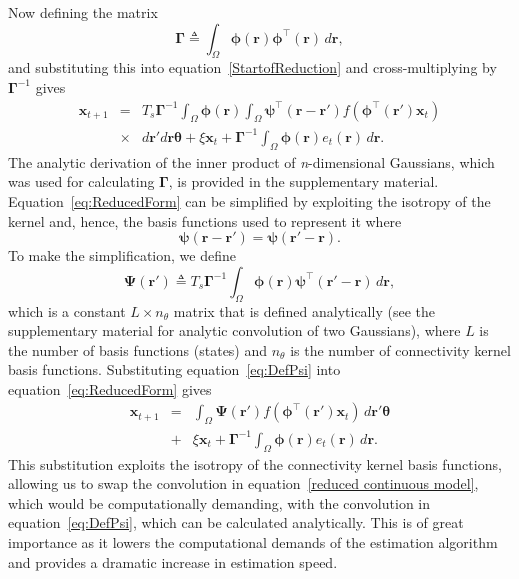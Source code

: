\documentclass[12pt]{iopart}
\begin{document}
Now defining the matrix
\begin{equation}\label{eq:DefGamma}
	\boldsymbol{\Gamma} \triangleq \int_\Omega {\boldsymbol{\phi} \left(\mathbf{r}\right)\boldsymbol{\phi} ^{\top}\left(\mathbf{r}\right) \, d\mathbf{r}}, 
\end{equation}
and substituting this into equation~\ref{StartofReduction} and cross-multiplying by $\boldsymbol{\Gamma}^{-1}$ gives
\begin{eqnarray}
    \label{eq:ReducedForm}
	 \mathbf{x}_{t+1} &=& T_s\boldsymbol{\Gamma}^{-1}
	 \int_\Omega \boldsymbol{\phi}(\mathbf{r}) 
	 \int_\Omega \boldsymbol{\psi}^{\top} (\mathbf{r}-\mathbf{r}')f(\boldsymbol{\phi}^{\top}(\mathbf{r}')\mathbf{x}_t) \nonumber \\
	&\times& d\mathbf{r}' d\mathbf{r} \boldsymbol{\theta}  
	 + \xi\mathbf{x}_t + \boldsymbol{\Gamma}^{-1} \int_\Omega{\boldsymbol{\phi}(\mathbf{r}) e_t(\mathbf{r}) \, d\mathbf{r}}.
\end{eqnarray}
The analytic derivation of the inner product of \emph{n}-dimensional Gaussians, which was used for calculating $\mathbf\Gamma$, is provided in the supplementary material. Equation~\ref{eq:ReducedForm} can be simplified by exploiting the isotropy of the kernel and, hence, the basis functions used to represent it where
\begin{equation}
	\boldsymbol{\psi} (\mathbf{r}-\mathbf{r}') = \boldsymbol{\psi} (\mathbf{r}'-\mathbf{r}).
\end{equation}
To make the simplification, we define
\begin{equation}\label{eq:DefPsi}
	\boldsymbol{\Psi}(\mathbf{r}') \triangleq T_s\boldsymbol{\Gamma}^{-1}\int_\Omega {\boldsymbol{\phi}(\mathbf{r})\boldsymbol{\psi}^{\top} (\mathbf{r}'-\mathbf{r}) \, d\mathbf{r}},
\end{equation}
which is a constant $L \times n_{\theta}$ matrix that is defined analytically (see the supplementary material for analytic convolution of two Gaussians), where $L$ is the number of basis functions (states) and $n_{\theta}$ is the number of connectivity kernel basis functions. Substituting equation~\ref{eq:DefPsi} into equation~\ref{eq:ReducedForm} gives
\begin{eqnarray}
	\mathbf{x}_{t+1} &=& \int_\Omega \boldsymbol{\Psi}(\mathbf{r}') f(\boldsymbol{\phi}^{\top}(\mathbf{r}')\mathbf{x}_t) \, d\mathbf{r}' \boldsymbol{\theta} \nonumber \\ &+& \xi\mathbf{x}_t 
+ \boldsymbol{\Gamma}^{-1} \int_\Omega{\boldsymbol{\phi}(\mathbf{r})e_t(\mathbf{r}) \, d\mathbf{r}}.
\end{eqnarray}
This substitution exploits the isotropy of the connectivity kernel basis functions, allowing us to swap the convolution in equation~\ref{reduced continuous model}, which would be computationally demanding, with the convolution in equation~\ref{eq:DefPsi}, which can be calculated analytically. This is of great importance as it lowers the computational demands of the estimation algorithm and provides a dramatic increase in estimation speed. 
\end{document}
